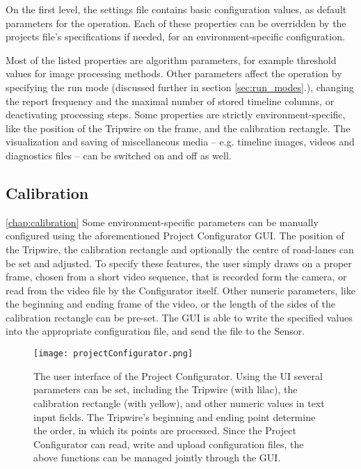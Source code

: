 On the first level, the settings file contains basic configuration values, as default parameters for the operation.
Each of these properties can be overridden by the projects file's specifications if needed, for an environment-specific configuration.

Most of the listed properties are algorithm parameters, for example threshold values for image processing methods.
Other parameters affect the operation by specifying the run mode (discussed further in section \ref{sec:run_modes}.), changing the report frequency and the maximal number of stored timeline columns, or deactivating processing steps.
Some properties are strictly environment-specific, like the position of the Tripwire on the frame, and the calibration rectangle.
The visualization and saving of miscellaneous media -- e.g. timeline images, videos and diagnostics files -- can be switched on and off as well.

\subsection{Calibration}\ref{chap:calibration}
Some environment-specific parameters can be manually configured using the aforementioned Project Configurator GUI.
The position of the Tripwire, the calibration rectangle and optionally the centre of road-lanes can be set and adjusted.
To specify these features, the user simply draws on a proper frame, chosen from a short video sequence, that is recorded form the camera, or read from the video file by the Configurator itself.
Other numeric parameters, like the beginning and ending frame of the video, or the length of the sides of the calibration rectangle can be pre-set.
The GUI is able to write the specified values into the appropriate configuration file, and send the file to the Sensor. 

\begin{figure}[!h]
	\centering
	\texttt{[image: projectConfigurator.png]}
	\caption{The user interface of the Project Configurator. Using the UI several parameters can be set, including the Tripwire (with lilac), the calibration rectangle (with yellow), and other numeric values in text input fields. The Tripwire's beginning and ending point determine the order, in which its points are processed. Since the Project Configurator can read, write and upload configuration files, the above functions can be managed jointly through the GUI. \label{fig:project_configurator}}
\end{figure}
